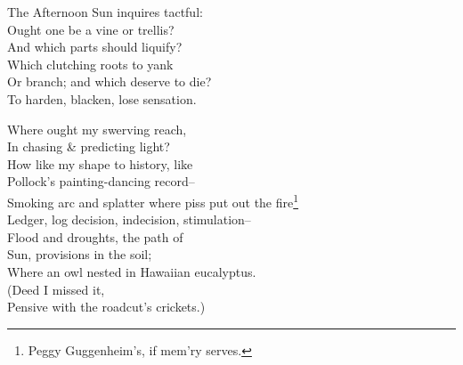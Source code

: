 \secdiv

The Afternoon Sun inquires tactful: \\
Ought one be a vine or trellis? \\
And which parts should liquify? \\
Which clutching roots to yank \\
Or branch; and which deserve to die? \\
To harden, blacken, lose sensation.

Where ought my swerving reach, \\
In chasing \& predicting light? \\
How like my shape to history, like \\
Pollock's painting-dancing record-- \\
Smoking arc and splatter where piss put out the fire\footnote{Peggy Guggenheim's, if mem'ry serves.} \\

Ledger, log decision, indecision, stimulation-- \\
Flood and droughts, the path of \\
Sun, provisions in the soil; \\
Where an owl nested in Hawaiian eucalyptus. \\
(Deed I missed it, \\
Pensive with the roadcut's crickets.)
